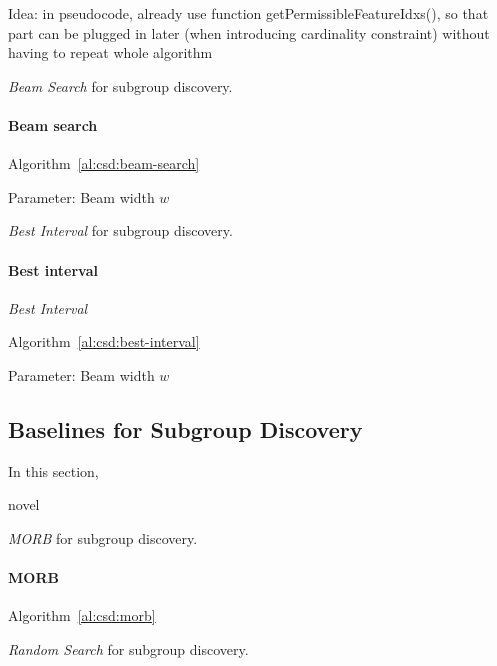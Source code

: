 \documentclass{article}
\theoremstyle{definition}
\begin{document}
Idea: in pseudocode, already use function getPermissibleFeatureIdxs(), so that part can be plugged in later (when introducing cardinality constraint) without having to repeat whole algorithm

\begin{algorithm}[t]
	\DontPrintSemicolon
	\caption{\emph{Beam Search} for subgroup discovery.}
	\label{al:csd:beam-search}
\end{algorithm}

\paragraph{Beam search}

Algorithm~\ref{al:csd:beam-search}

Parameter: Beam width $w$

\begin{algorithm}[t]
	\DontPrintSemicolon
	\caption{\emph{Best Interval} for subgroup discovery.}
	\label{al:csd:best-interval}
\end{algorithm}

\paragraph{Best interval}

\emph{Best Interval}~\cite{mampaey2012efficient}

Algorithm~\ref{al:csd:best-interval}

Parameter: Beam width $w$

\subsection{Baselines for Subgroup Discovery}
\label{sec:csd:fundamentals:baselines}

In this section,

novel

\begin{algorithm}[t]
	\DontPrintSemicolon
	\caption{\emph{MORB} for subgroup discovery.}
	\label{al:csd:morb}
\end{algorithm}

\paragraph{MORB}

Algorithm~\ref{al:csd:morb}

\begin{algorithm}[t]
	\DontPrintSemicolon
	\caption{\emph{Random Search} for subgroup discovery.}
	\label{al:csd:random-search}
\end{algorithm}
\end{document}
